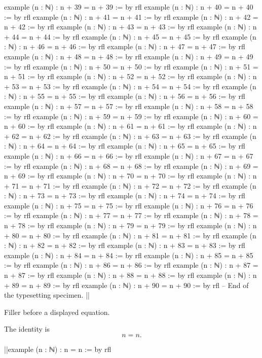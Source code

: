 \documentclass{article}
\begin{document}
\begin{lean}
  example (n : ℕ) : n + 39 = n + 39 := by rfl
  example (n : ℕ) : n + 40 = n + 40 := by rfl
  example (n : ℕ) : n + 41 = n + 41 := by rfl
  example (n : ℕ) : n + 42 = n + 42 := by rfl
  example (n : ℕ) : n + 43 = n + 43 := by rfl
  example (n : ℕ) : n + 44 = n + 44 := by rfl
  example (n : ℕ) : n + 45 = n + 45 := by rfl
  example (n : ℕ) : n + 46 = n + 46 := by rfl
  example (n : ℕ) : n + 47 = n + 47 := by rfl
  example (n : ℕ) : n + 48 = n + 48 := by rfl
  example (n : ℕ) : n + 49 = n + 49 := by rfl
  example (n : ℕ) : n + 50 = n + 50 := by rfl
  example (n : ℕ) : n + 51 = n + 51 := by rfl
  example (n : ℕ) : n + 52 = n + 52 := by rfl
  example (n : ℕ) : n + 53 = n + 53 := by rfl
  example (n : ℕ) : n + 54 = n + 54 := by rfl
  example (n : ℕ) : n + 55 = n + 55 := by rfl
  example (n : ℕ) : n + 56 = n + 56 := by rfl
  example (n : ℕ) : n + 57 = n + 57 := by rfl
  example (n : ℕ) : n + 58 = n + 58 := by rfl
  example (n : ℕ) : n + 59 = n + 59 := by rfl
  example (n : ℕ) : n + 60 = n + 60 := by rfl
  example (n : ℕ) : n + 61 = n + 61 := by rfl
  example (n : ℕ) : n + 62 = n + 62 := by rfl
  example (n : ℕ) : n + 63 = n + 63 := by rfl
  example (n : ℕ) : n + 64 = n + 64 := by rfl
  example (n : ℕ) : n + 65 = n + 65 := by rfl
  example (n : ℕ) : n + 66 = n + 66 := by rfl
  example (n : ℕ) : n + 67 = n + 67 := by rfl
  example (n : ℕ) : n + 68 = n + 68 := by rfl
  example (n : ℕ) : n + 69 = n + 69 := by rfl
  example (n : ℕ) : n + 70 = n + 70 := by rfl
  example (n : ℕ) : n + 71 = n + 71 := by rfl
  example (n : ℕ) : n + 72 = n + 72 := by rfl
  example (n : ℕ) : n + 73 = n + 73 := by rfl
  example (n : ℕ) : n + 74 = n + 74 := by rfl
  example (n : ℕ) : n + 75 = n + 75 := by rfl
  example (n : ℕ) : n + 76 = n + 76 := by rfl
  example (n : ℕ) : n + 77 = n + 77 := by rfl
  example (n : ℕ) : n + 78 = n + 78 := by rfl
  example (n : ℕ) : n + 79 = n + 79 := by rfl
  example (n : ℕ) : n + 80 = n + 80 := by rfl
  example (n : ℕ) : n + 81 = n + 81 := by rfl
  example (n : ℕ) : n + 82 = n + 82 := by rfl
  example (n : ℕ) : n + 83 = n + 83 := by rfl
  example (n : ℕ) : n + 84 = n + 84 := by rfl
  example (n : ℕ) : n + 85 = n + 85 := by rfl
  example (n : ℕ) : n + 86 = n + 86 := by rfl
  example (n : ℕ) : n + 87 = n + 87 := by rfl
  example (n : ℕ) : n + 88 = n + 88 := by rfl
  example (n : ℕ) : n + 89 = n + 89 := by rfl
  example (n : ℕ) : n + 90 = n + 90 := by rfl
  -- End of the typesetting specimen.
  |\label{long-end}|
\end{lean}
\clearpage
\noindent\rule{0pt}{85mm}
Filler before a displayed equation.
\par
The identity is
\[
  n = n.\label{display-prose}
\]

\begin{lean}
  |\label{display-start}|example (n : ℕ) : n = n := by
    rfl
\end{lean}
\end{document}
